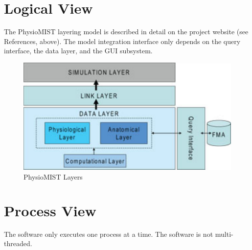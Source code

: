 \documentclass{article}
\begin{document}
\section{Logical View}
The PhysioMIST layering model is described in detail on the project website (see References, above). The model integration interface only depends on the query interface, the data layer, and the GUI subsystem.
\begin{figure}[!htb]
\centering
\includegraphics{./diagrams/layers}
\caption{PhysioMIST Layers}
\end{figure}

\section{Process View}
The software only executes one process at a time. The software is not multi-threaded.
\end{document}
